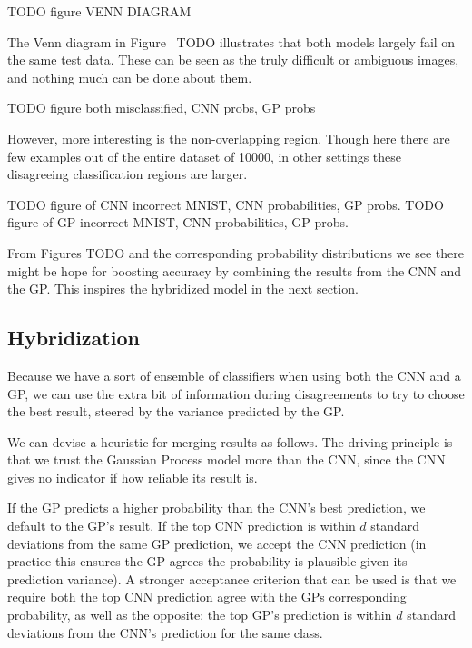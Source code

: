 \documentclass{article}
\begin{document}
TODO figure VENN DIAGRAM

The Venn diagram in Figure~ TODO illustrates that both models largely fail on the same test data. These can be seen as the truly difficult or ambiguous images, and nothing much can be done about them.

TODO figure both misclassified, CNN probs, GP probs

However, more interesting is the non-overlapping region. Though here there are few examples out of the entire dataset of 10000, in other settings these disagreeing classification regions are larger.

TODO figure of CNN incorrect MNIST, CNN probabilities, GP probs.
TODO figure of GP incorrect MNIST, CNN probabilities, GP probs.

From Figures TODO and the corresponding probability distributions we see there might be hope for boosting accuracy by combining the results from the CNN and the GP. This inspires the hybridized model in the next section.


\subsection{Hybridization}
\label{sec:mnist:hybridization}

Because we have a sort of ensemble of classifiers when using both the CNN and a GP, we can use the extra bit of information during disagreements to try to choose the best result, steered by the variance predicted by the GP.

We can devise a heuristic for merging results as follows. The driving principle is that we trust the Gaussian Process model more than the CNN, since the CNN gives no indicator if how reliable its result is.

If the GP predicts a higher probability than the CNN's best prediction, we default to the GP's result. If the top CNN prediction is within $d$ standard deviations from the same GP prediction, we accept the CNN prediction (in practice this ensures the GP agrees the probability is plausible given its prediction variance). A stronger acceptance criterion that can be used is that we require both the top CNN prediction agree with the GPs corresponding probability, as well as the opposite: the top GP's prediction is within $d$ standard deviations from the CNN's prediction for the same class.
\end{document}

